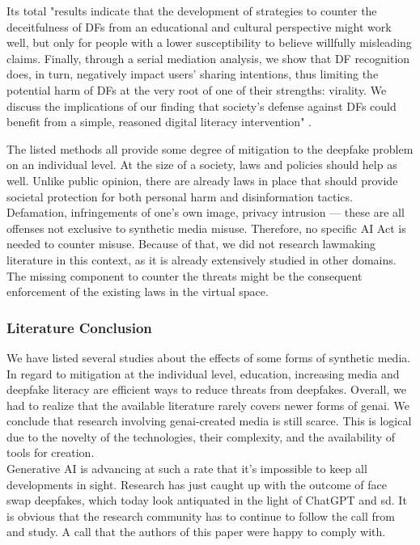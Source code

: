 \documentclass[
  a4paper,  %
  twoside,  %
  bibliography=totoc,
  headsepline,
  cleardoublepage=empty,
  parskip=half,
  draft=false
]{scrbook}
\begin{document}
Its total "results indicate that the development of strategies to counter the deceitfulness of DFs from an educational and cultural perspective might work well, but only for people with a lower susceptibility to believe willfully misleading claims. Finally, through a serial mediation analysis, we show that DF recognition does, in turn, negatively impact users' sharing intentions, thus limiting the potential harm of DFs at the very root of one of their strengths: virality. We discuss the implications of our finding that society's defense against DFs could benefit from a simple, reasoned digital literacy intervention" \cite{iacobucciDeepfakesUnmaskedEffects2021}.

The listed methods all provide some degree of mitigation to the deepfake problem on an individual level. At the size of a society, laws and policies should help as well. Unlike public opinion, there are already laws in place that should provide societal protection for both personal harm and disinformation tactics. Defamation, infringements of one's own image, privacy intrusion — these are all offenses not exclusive to synthetic media misuse. Therefore, no specific AI Act is needed to counter misuse. Because of that, we did not research lawmaking literature in this context, as it is already extensively studied in other domains. The missing component to counter the threats might be the consequent enforcement of the existing laws in the virtual space. 

\subsubsection*{Literature Conclusion}
We have listed several studies about the effects of some forms of synthetic media. In regard to mitigation at the individual level, education, increasing media and deepfake literacy are efficient ways to reduce threats from deepfakes. Overall, we had to realize that the available literature rarely covers newer forms of \gls{genai}.
We conclude that research involving \gls{genai}-created media is still scarce. This is logical due to the novelty of the technologies, their complexity, and the availability of tools for creation. \\
Generative AI is advancing at such a rate that it's impossible to keep all developments in sight. Research has just caught up with the outcome of face swap deepfakes, which today look antiquated in the light of ChatGPT and \gls{sd}. 
It is obvious that the research community has to continue to follow the call from \citet{hancockSocialImpactDeepfakes2021} and study. A call that the authors of this paper were happy to comply with.
\end{document}
